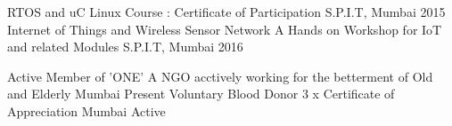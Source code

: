 \begin{cvhonors}

  \cvhonor
    {RTOS and uC Linux} %
    {Course : Certificate of Participation} %
    {S.P.I.T, Mumbai}
    {2015}
  \cvhonor
    {Internet of Things and Wireless Sensor Network} %
    {A Hands on Workshop for IoT and related Modules} %
    {S.P.I.T, Mumbai}
    {2016}
\end{cvhonors}





\begin{cvhonors}

  \cvhonor
    {Active Member of 'ONE'} %
    {A NGO acctively working for the betterment of Old and Elderly} %
    {Mumbai}
    {Present}
  \cvhonor
    {Voluntary Blood Donor} %
    {3 x Certificate of Appreciation} %
    {Mumbai}
    {Active}

\end{cvhonors}
